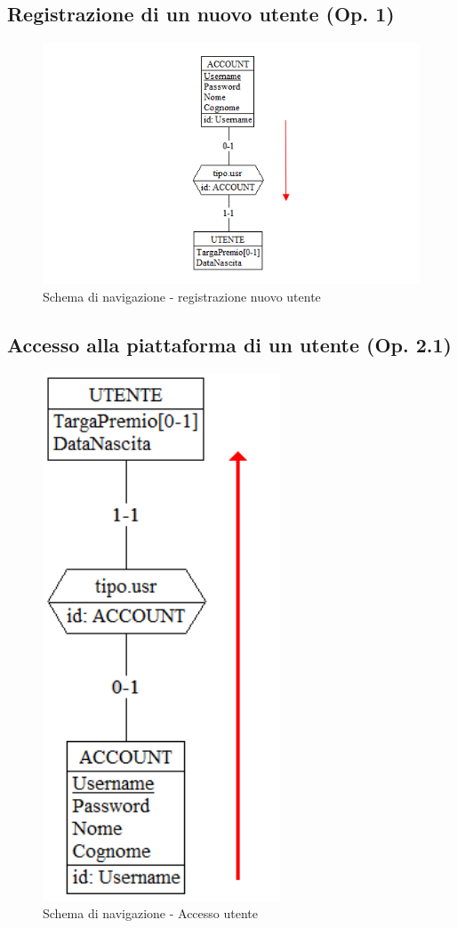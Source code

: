 \documentclass[a4paper,12pt]{report}
\begin{document}
	\subsection{Registrazione di un nuovo utente (Op. 1)}
	\begin{figure}[H]
		\centering
		\includegraphics[width=450pt]{ER/navigazione/registrazioneutente.png}
		\caption{Schema di navigazione - registrazione nuovo utente}
	\end{figure}
	
	\subsection{Accesso alla piattaforma di un utente (Op. 2.1)}
	\begin{figure}[H]
		\centering
		\includegraphics[width=200pt]{ER/navigazione/accessoutente.png}
		\caption{Schema di navigazione - Accesso utente}
	\end{figure}
	
\end{document}
